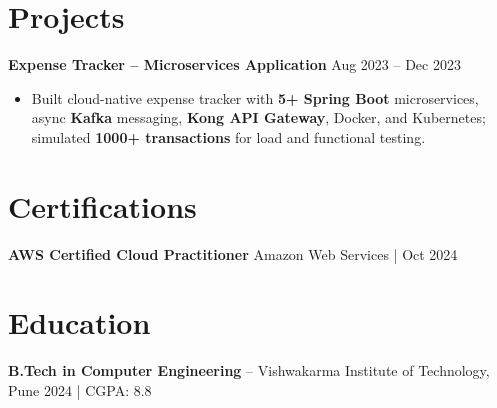 \documentclass[letterpaper,10pt]{article}
\begin{document}
\section*{Projects}

\textbf{Expense Tracker -- Microservices Application} \hfill Aug 2023 -- Dec 2023
\begin{itemize}[leftmargin=*]
    \item Built cloud-native expense tracker with \textbf{5+ Spring Boot} microservices, async \textbf{Kafka} messaging, \textbf{Kong API Gateway}, Docker, and Kubernetes; simulated \textbf{1000+ transactions} for load and functional testing.
\end{itemize}

\section*{Certifications}
\textbf{AWS Certified Cloud Practitioner} \hfill Amazon Web Services \;|\; Oct 2024

\section*{Education}
\textbf{B.Tech in Computer Engineering} -- Vishwakarma Institute of Technology, Pune \hfill 2024 \;|\; CGPA: 8.8
\end{document}
